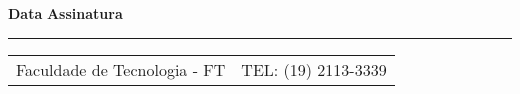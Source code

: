 \documentclass[10pt, a4paper]{article}
\begin{document}
\vspace{0.5cm}

\textbf{Data} \hspace{0.5cm} \underline{\hspace{3.5cm}}
\hspace{0.3cm}
\textbf{Assinatura} \hspace{0.5cm} \underline{\hspace{6.6cm}}

\vfill
\begin{center}
    \hrule
    \vspace{0.1cm}
    {\scriptsize
        \begin{tabularx}{\textwidth}{X r}
            Faculdade de Tecnologia - FT & TEL: (19) 2113-3339 \\
        \end{tabularx}
    }
\end{center}
\end{document}
